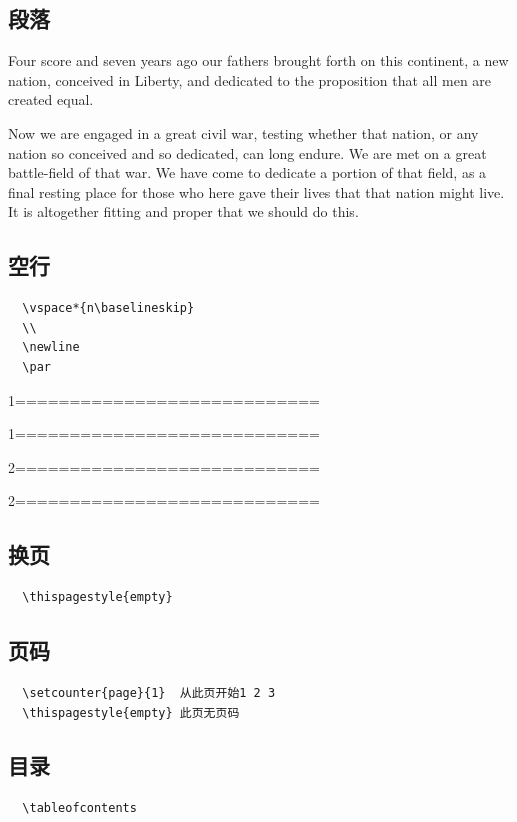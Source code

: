 \documentclass[onecolumn,oneside]{SUSTechHomework}
\begin{document}
\subsection{段落}
Four score and seven years ago our fathers brought forth on this continent, 
a new nation, conceived in Liberty, and dedicated to the proposition that 
all men are created equal. \par

Now we are engaged in a great civil war, testing whether that nation, 
or any nation so conceived and so dedicated, can long endure. 
We are met on a great battle-field of that war. We have come to dedicate 
a portion of that field, as a final resting place for those 
who here gave their lives that that nation might live. 
It is altogether fitting and proper that we should do this.\par
\subsection{空行}
\begin{lstlisting}
  \vspace*{n\baselineskip}
  \\
  \newline
  \par
\end{lstlisting}
1============================\par
\vspace*{1\baselineskip} 
1============================\par
2============================\par
\vspace*{2\baselineskip} 
2============================
\subsection{换页}
\begin{lstlisting}
  \thispagestyle{empty}
\end{lstlisting}
\subsection{页码}
\begin{lstlisting}
  \setcounter{page}{1}  从此页开始1 2 3
  \thispagestyle{empty} 此页无页码
\end{lstlisting}
\subsection{目录}
\begin{lstlisting}
  \tableofcontents  
\end{lstlisting}
\end{document}
